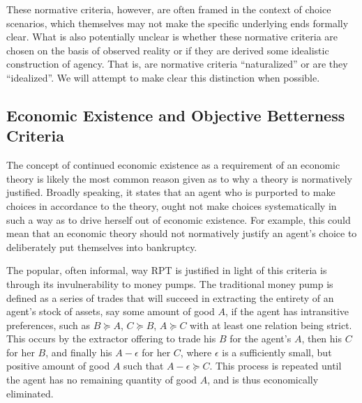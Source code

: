 \documentclass[../main.tex]{subfiles}
\begin{document}
These normative criteria, however, are often framed in the context of choice scenarios, which themselves may not make the specific underlying ends formally clear.
What is also potentially unclear is whether these normative criteria are chosen on the basis of observed reality or if they are derived some idealistic construction of agency.
That is, are normative criteria \enquote{naturalized} or are they \enquote{idealized}.
We will attempt to make clear this distinction when possible.

\subsection{Economic Existence and Objective Betterness Criteria}

The concept of continued economic existence as a requirement of an economic theory is likely the most common reason given as to why a theory is normatively justified.
Broadly speaking, it states that an agent who is purported to make choices in accordance to the theory, ought not make choices systematically in such a way as to drive herself out of economic existence.
For example, this could mean that an economic theory should not normatively justify an agent's choice to deliberately put themselves into bankruptcy.{\footnotemark}

\addtocounter{footnote}{-1}

The popular, often informal, way RPT is justified in light of this criteria is through its invulnerability to money pumps.
The traditional money pump is defined as a series of trades that will succeed in extracting the entirety of an agent's stock of assets, say some amount of good $A$, if the agent has intransitive preferences, such as $B \succcurlyeq A$, $C \succcurlyeq B$, $A \succcurlyeq C$ with at least one relation being strict.
This occurs by the extractor offering to trade his $B$ for the agent's $A$, then his $C$ for her $B$, and finally his $A - \epsilon$ for her $C$, where $\epsilon$ is a sufficiently small, but positive amount of good $A$ such that $A - \epsilon \succcurlyeq C$.
This process is repeated until the agent has no remaining quantity of good $A$, and is thus economically eliminated.
\end{document}
